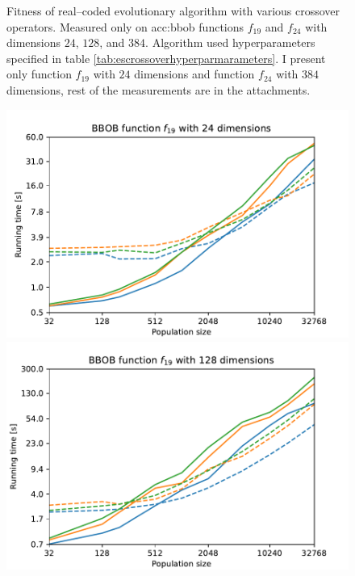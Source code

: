 \begin{figure}[ht!]
    \caption[Fitness of various crossover operators in real--coded evolutionary algorithms]{Fitness of real--coded evolutionary algorithm with various crossover operators. Measured only on \acrshort{acc:bbob} functions $f_{19}$ and $f_{24}$ with dimensions $24$, $128$, and $384$. Algorithm used hyperparameters specified in table \ref{tab:escrossoverhyperparmarameters}. I present only function $f_{19}$ with $24$ dimensions and function $f_{24}$ with $384$ dimensions, rest of the measurements are in the attachments.}
\end{figure}




\begin{figure}[ht!]
    \begin{minipage}[t]{0.32\textwidth}
        \centering
        \includegraphics[width=\textwidth]{img/runs/time_es_schema_fn19_24d.pdf}
    \end{minipage}
    \hfill
    \begin{minipage}[t]{0.32\textwidth}
        \centering
        \includegraphics[width=\textwidth]{img/runs/time_es_schema_fn19_128d.pdf}

\end{minipage}
\end{figure}
